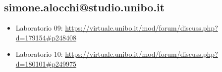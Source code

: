 \documentclass[a4paper,12pt]{report}
\begin{document}
\subsection{simone.alocchi@studio.unibo.it}

\begin{itemize}
 \item Laboratorio 09: \url{https://virtuale.unibo.it/mod/forum/discuss.php?d=179154#p248408}
 \item Laboratorio 10: \url{https://virtuale.unibo.it/mod/forum/discuss.php?d=180101#p249975}
\end{itemize}
\end{document}
